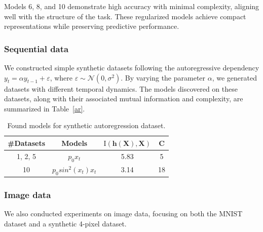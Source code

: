 \documentclass[14pt]{extarticle}
\begin{document}
    Models 6, 8, and 10 demonstrate high accuracy with minimal complexity, aligning well with the structure of the task. These regularized models achieve compact representations while preserving predictive performance.
        
    \subsubsection{Sequential data}
        We constructed simple synthetic datasets following the autoregressive dependency \(y_t = \alpha y_{t-1} + \varepsilon\), where \(\varepsilon \sim \mathcal{N}(0, \sigma^2)\). By varying the parameter \(\alpha\), we generated datasets with different temporal dynamics. The models discovered on these datasets, along with their associated mutual information and complexity, are summarized in Table~\ref{ar}.
        \begin{table}[ht!]\label{ar}
            \centering
            \begin{tabular}{|c|c|c|c|}
                \hline
                 \#Datasets & Models & \(\operatorname{I(\mathbf{h}(\mathbf{X}), \mathbf{X})}\) & C \\ \hline 
                 1, 2, 5 & \(p_0 x_t\) & 5.83 & 5 \\
                 10 & \(p_0 sin^2(x_t)x_t\) &  3.14 & 18 \\ \hline
            \end{tabular}
            \caption{Found models for synthetic autoregression dataset.}
            \label{tab:my_label}
        \end{table}

    \subsubsection{Image data}
        We also conducted experiments on image data, focusing on both the MNIST dataset and a synthetic 4-pixel dataset.
        
\end{document}
